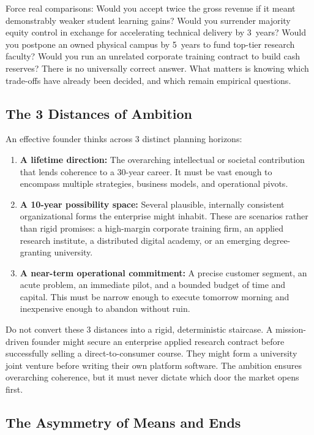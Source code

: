 Force real comparisons: Would you accept twice the gross revenue if it meant demonstrably weaker student learning gains? Would you surrender majority equity control in exchange for accelerating technical delivery by 3~years? Would you postpone an owned physical campus by 5~years to fund top-tier research faculty? Would you run an unrelated corporate training contract to build cash reserves? There is no universally correct answer. What matters is knowing which trade-offs have already been decided, and which remain empirical questions.

\subsection{The 3 Distances of Ambition}

An effective founder thinks across 3 distinct planning horizons:

\begin{enumerate}[leftmargin=12pt,itemsep=2pt,topsep=1pt,parsep=0pt]
  \item \textbf{A lifetime direction:} The overarching intellectual or societal contribution that lends coherence to a 30-year career. It must be vast enough to encompass multiple strategies, business models, and operational pivots.
  \item \textbf{A 10-year possibility space:} Several plausible, internally consistent organizational forms the enterprise might inhabit. These are scenarios rather than rigid promises: a high-margin corporate training firm, an applied research institute, a distributed digital academy, or an emerging degree-granting university.
  \item \textbf{A near-term operational commitment:} A precise customer segment, an acute problem, an immediate pilot, and a bounded budget of time and capital. This must be narrow enough to execute tomorrow morning and inexpensive enough to abandon without ruin.
\end{enumerate}

Do not convert these 3 distances into a rigid, deterministic staircase. A mission-driven founder might secure an enterprise applied research contract before successfully selling a direct-to-consumer course. They might form a university joint venture before writing their own platform software. The ambition ensures overarching coherence, but it must never dictate which door the market opens first.

\subsection{The Asymmetry of Means and Ends}

